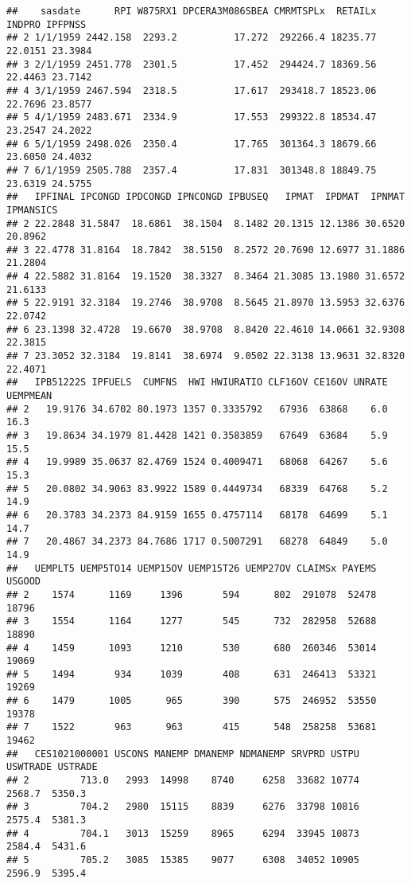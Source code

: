 \documentclass[
]{article}
\begin{document}
\begin{verbatim}
##    sasdate      RPI W875RX1 DPCERA3M086SBEA CMRMTSPLx  RETAILx  INDPRO IPFPNSS
## 2 1/1/1959 2442.158  2293.2          17.272  292266.4 18235.77 22.0151 23.3984
## 3 2/1/1959 2451.778  2301.5          17.452  294424.7 18369.56 22.4463 23.7142
## 4 3/1/1959 2467.594  2318.5          17.617  293418.7 18523.06 22.7696 23.8577
## 5 4/1/1959 2483.671  2334.9          17.553  299322.8 18534.47 23.2547 24.2022
## 6 5/1/1959 2498.026  2350.4          17.765  301364.3 18679.66 23.6050 24.4032
## 7 6/1/1959 2505.788  2357.4          17.831  301348.8 18849.75 23.6319 24.5755
##   IPFINAL IPCONGD IPDCONGD IPNCONGD IPBUSEQ   IPMAT  IPDMAT  IPNMAT IPMANSICS
## 2 22.2848 31.5847  18.6861  38.1504  8.1482 20.1315 12.1386 30.6520   20.8962
## 3 22.4778 31.8164  18.7842  38.5150  8.2572 20.7690 12.6977 31.1886   21.2804
## 4 22.5882 31.8164  19.1520  38.3327  8.3464 21.3085 13.1980 31.6572   21.6133
## 5 22.9191 32.3184  19.2746  38.9708  8.5645 21.8970 13.5953 32.6376   22.0742
## 6 23.1398 32.4728  19.6670  38.9708  8.8420 22.4610 14.0661 32.9308   22.3815
## 7 23.3052 32.3184  19.8141  38.6974  9.0502 22.3138 13.9631 32.8320   22.4071
##   IPB51222S IPFUELS  CUMFNS  HWI HWIURATIO CLF16OV CE16OV UNRATE UEMPMEAN
## 2   19.9176 34.6702 80.1973 1357 0.3335792   67936  63868    6.0     16.3
## 3   19.8634 34.1979 81.4428 1421 0.3583859   67649  63684    5.9     15.5
## 4   19.9989 35.0637 82.4769 1524 0.4009471   68068  64267    5.6     15.3
## 5   20.0802 34.9063 83.9922 1589 0.4449734   68339  64768    5.2     14.9
## 6   20.3783 34.2373 84.9159 1655 0.4757114   68178  64699    5.1     14.7
## 7   20.4867 34.2373 84.7686 1717 0.5007291   68278  64849    5.0     14.9
##   UEMPLT5 UEMP5TO14 UEMP15OV UEMP15T26 UEMP27OV CLAIMSx PAYEMS USGOOD
## 2    1574      1169     1396       594      802  291078  52478  18796
## 3    1554      1164     1277       545      732  282958  52688  18890
## 4    1459      1093     1210       530      680  260346  53014  19069
## 5    1494       934     1039       408      631  246413  53321  19269
## 6    1479      1005      965       390      575  246952  53550  19378
## 7    1522       963      963       415      548  258258  53681  19462
##   CES1021000001 USCONS MANEMP DMANEMP NDMANEMP SRVPRD USTPU USWTRADE USTRADE
## 2         713.0   2993  14998    8740     6258  33682 10774   2568.7  5350.3
## 3         704.2   2980  15115    8839     6276  33798 10816   2575.4  5381.3
## 4         704.1   3013  15259    8965     6294  33945 10873   2584.4  5431.6
## 5         705.2   3085  15385    9077     6308  34052 10905   2596.9  5395.4

\end{verbatim}
\end{document}

